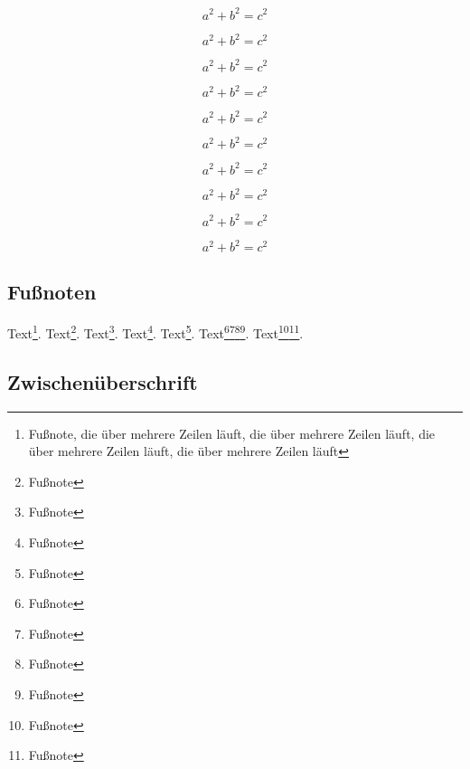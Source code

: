 \documentclass[ngerman]{scrartcl}
\begin{document}
	\begin{equation}
		a^2+b^2=c^2
	\end{equation}

	\begin{equation}
		a^2+b^2=c^2
	\end{equation}

	\begin{equation}
		a^2+b^2=c^2
	\end{equation}

	\begin{equation}
		a^2+b^2=c^2
	\end{equation}

	\begin{equation}
		a^2+b^2=c^2
	\end{equation}

	\begin{equation}
		a^2+b^2=c^2
	\end{equation}

	\begin{equation}
		a^2+b^2=c^2
	\end{equation}

	\begin{equation}
		a^2+b^2=c^2
	\end{equation}

	\begin{equation}
		a^2+b^2=c^2
	\end{equation}

	\begin{equation}
		a^2+b^2=c^2
	\end{equation}

	\subsection{Fußnoten}

	Text\footnote{Fußnote, die über mehrere Zeilen läuft, die über mehrere Zeilen läuft, die über mehrere Zeilen läuft, die über mehrere Zeilen läuft}.
	Text\footnote{Fußnote}.
	Text\footnote{Fußnote}.
	Text\footnote{Fußnote}.
	Text\footnote{Fußnote}.
	Text\footnote{Fußnote}\multiplefootnoteseparator\footnote{Fußnote}\footnote{Fußnote}\footnote{Fußnote}.
	Text\footnote{Fußnote}\footnote{Fußnote}.

	\lipsum[1-1]




	\lipsum[1-1]

	\subsection*{Zwischenüberschrift}
\end{document}
